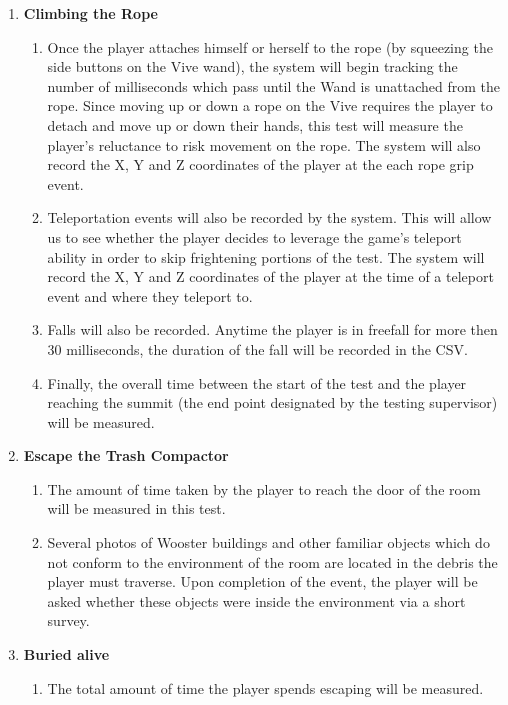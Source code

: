 \begin{enumerate}
	\item \textbf{Climbing the Rope} \begin{enumerate}
		\item Once the player attaches himself or herself to the rope (by squeezing the side buttons on the Vive wand), the system will begin tracking the number of milliseconds which pass until the Wand is unattached from the rope. Since moving up or down a rope on the Vive requires the player to detach and move up or down their hands, this test will measure the player's reluctance to risk movement on the rope. The system will also record the X, Y and Z coordinates of the player at the each rope grip event.
	\item Teleportation events will also be recorded by the system. This will allow us to see whether the player decides to leverage the game's teleport ability in order to skip frightening portions of the test. The system will record the X, Y and Z coordinates of the player at the time of a teleport event and where they teleport to.
	\item Falls will also be recorded. Anytime the player is in freefall for more then 30 milliseconds, the duration of the fall will be recorded in the CSV.
	\item Finally, the overall time between the start of the test and the player reaching the summit (the end point designated by the testing supervisor) will be measured.	
\end{enumerate}
\item \textbf{Escape the Trash Compactor}   \begin{enumerate}
	\item The amount of time taken by the player to reach the door of the room will be measured in this test.
	\item Several photos of Wooster buildings and other familiar objects which do not conform to the  environment of the room are located in the debris the player must traverse. Upon completion of the event, the player will be asked whether these objects were inside the environment via a short survey.
\end{enumerate}
\item \textbf{Buried alive} \begin{enumerate}
	\item The total amount of time the player spends escaping will be measured. 
\end{enumerate}
\end{enumerate}
